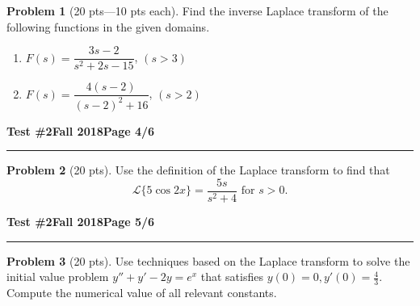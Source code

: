 \documentclass[12pt]{article}
\theoremstyle{definition}
\newtheorem{problem}{Problem}
\begin{document}
\bigskip
\begin{problem}[20 pts---10 pts each]
  Find the inverse Laplace transform of the following functions in the given domains.
  \begin{enumerate}
  \item $F(s) = \dfrac{3s-2}{s^2+2s-15}$, $(s>3)$
    \vspace{8cm}
    \begin{flushright}
    \end{flushright} 
  \item $F(s) = \dfrac{4(s-2)}{(s-2)^2+16}$, $(s>2)$
    \vspace{8cm}
    \begin{flushright}
    \end{flushright} 
  \end{enumerate}
\end{problem}
\newpage

\hfill{\large\bf Test \#2}\hfill{\large\bf Fall 2018}\hfill{\large\bf Page 4/6}\hrule

\bigskip
\begin{problem}[20 pts]
  Use the definition of the Laplace transform to find that 
  \begin{equation*}
    \mathcal{L}\{ 5\cos 2x \} = \frac{5s}{s^2 + 4}
    \text{ for }s>0.
  \end{equation*}

\end{problem}
\newpage

\hfill{\large\bf Test \#2}\hfill{\large\bf Fall 2018}\hfill{\large\bf Page 5/6}\hrule

\bigskip
\begin{problem}[20 pts]
  Use techniques based on the Laplace transform to solve the initial value problem $y''+y'-2y=e^x$ that satisfies
  $y(0)=0, y'(0)=\tfrac{4}{3}$.  Compute the numerical value of all relevant constants.
  \vspace{20cm}
  \begin{flushright}
  \end{flushright}
\end{problem}
\newpage
\end{document}
